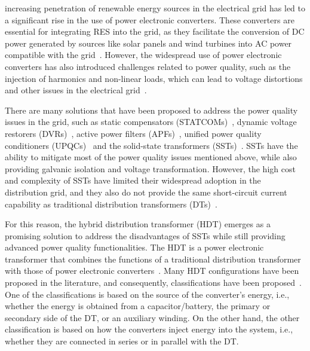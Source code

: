  increasing penetration of renewable energy sources in the electrical grid has led to a significant rise in the use of power electronic converters. These converters are essential for integrating RES into the grid, as they facilitate the conversion of DC power generated by sources like solar panels and wind turbines into AC power compatible with the grid~\cite{Blaabjerg2023}. However, the widespread use of power electronic converters has also introduced challenges related to power quality, such as the injection of harmonics and non-linear loads, which can lead to voltage distortions and other issues in the electrical grid~\cite{Najafzadeh2021,Sepasi2023}.

There are many solutions that have been proposed to address the power quality issues in the grid, such as static compensators (STATCOMs)~\cite{Engelbrecht2023}, dynamic voltage restorers (DVRs)~\cite{Kandil2020}, active power filters (APFs)~\cite{Mishra2020}, unified power quality conditioners (UPQCs)~\cite{Fujita1998} and the solid-state transformers (SSTs)~\cite{Huber2019}. SSTs have the ability to mitigate most of the power quality issues mentioned above, while also providing galvanic isolation and voltage transformation. However, the high cost and complexity of SSTs have limited their widespread adoption in the distribution grid, and they also do not provide the same short-circuit current capability as traditional distribution transformers (DTs)~\cite{carrenoConfigurationsPowerTopologies2021}.

For this reason, the hybrid distribution transformer (HDT) emerges as a promising solution to address the disadvantages of SSTs while still providing advanced power quality functionalities.
The HDT is a power electronic transformer that combines the functions of a traditional distribution transformer with those of power electronic converters~\cite{haj-maharsiHybridDistributionTransformer2010,matelskiBadaniaEksperymentalneTransformatora2023}. Many HDT configurations have been proposed in the literature, and consequently, classifications have been proposed~\cite{carrenoConfigurationsPowerTopologies2021}. One of the classifications is based on the source of the converter's energy, i.e., whether the energy is obtained from a capacitor/battery, the primary or secondary side of the DT, or an auxiliary winding. On the other hand, the other classification is based on how the converters inject energy into the system, i.e., whether they are connected in series or in parallel with the DT. 

